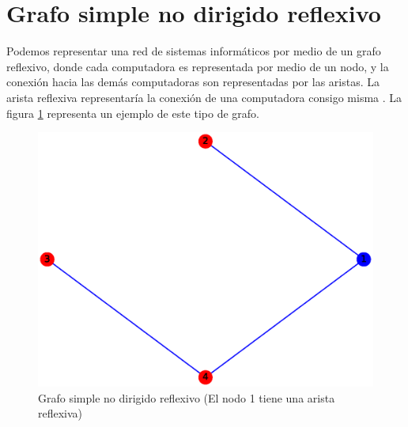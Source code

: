 \documentclass{article}
\begin{document}

\section{Grafo simple no dirigido reflexivo}
Podemos representar una red de sistemas informáticos por medio de un grafo reflexivo, donde cada computadora es representada por medio de un nodo, y la conexión hacia las demás computadoras son representadas por las aristas. La arista reflexiva representaría la conexión de una computadora consigo misma \cite{GSNDR}. La figura \ref{fig:GSNDR} representa un ejemplo de este tipo de grafo.
\begin{figure}[H]
    \includegraphics[width=\textwidth]{3-GSNDC}
    \caption{Grafo simple no dirigido reflexivo (El nodo 1 tiene una arista reflexiva)}
    \label{fig:GSNDR}
\end{figure}



\end{document}
